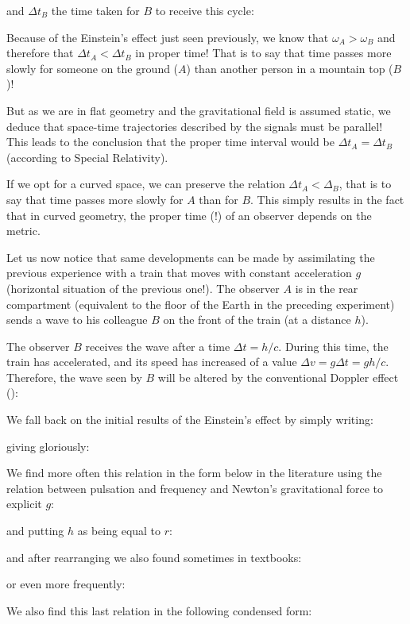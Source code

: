 	and $\Delta t_B$ the time taken for $B$ to receive this cycle:
	
	Because of the Einstein's effect just seen previously, we know that $\omega_A>\omega_B$ and therefore that $\Delta t_A<\Delta t_B$ in proper time! That is to say that time passes more slowly for someone on the ground ($A$) than another person in a mountain top ($B$)!

	But as we are in flat geometry and the gravitational field is assumed static, we deduce that space-time trajectories described by the signals must be parallel! This leads to the conclusion that the proper time interval would be $\Delta t_A=\Delta t_B$ (according to Special Relativity).
	
	If we opt for a curved space, we can preserve the relation $\Delta t_A<\Delta_B$, that is to say that time passes more slowly for $A$ than for $B$. This simply results in the fact that in curved geometry, the proper time (!) of an observer depends on the metric.

	Let us now notice that same developments can be made by assimilating the previous experience with a train that moves with constant acceleration $g$ (horizontal situation of the previous one!). The observer $A$ is in the rear compartment (equivalent to the floor of the Earth in the preceding experiment) sends a wave to his colleague $B$ on the front of the train (at a distance $h$).
	
	The observer $B$ receives the wave after a time $\Delta t=h/c$. During this time, the train has accelerated, and its speed has increased of a value $\Delta v=g\Delta t=gh/c$. Therefore, the wave seen by $B$ will be altered by the conventional Doppler effect ():
	
	We fall back on the initial results of the Einstein's effect by simply writing:
	
	giving gloriously:
	
	We find more often this relation in the form below in the literature using the relation between pulsation and frequency and Newton's gravitational force to explicit $g$:
	
	 and putting $h$ as being equal to $r$:
	 
	and after rearranging we also found sometimes in textbooks:
	
	or even more frequently:
	
	We also find this last relation in the following condensed form:
	
